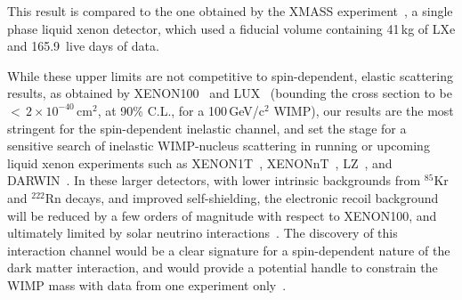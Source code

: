 This result is compared to the one obtained by the XMASS experiment~\cite{Uchida:2014cnn}, a single phase liquid xenon detector, which used a fiducial volume containing 41\,kg of LXe and 165.9~live days of data. 


While these upper limits are not competitive to spin-dependent, elastic scattering results, as obtained by XENON100~\cite{Aprile:2013doa} and LUX~\cite{Akerib:2016lao} 
(bounding the cross section to be $<\,2 \times 10^{-40}$\,cm$^{2}$, at 90\% C.L.,  for a 100\,GeV/c$^2$ WIMP), 
our results are the most stringent for the spin-dependent inelastic channel, and set the stage for a sensitive search of inelastic WIMP-nucleus scattering in running or upcoming liquid xenon experiments such as XENON1T~\cite{Aprile:2015uzo}, XENONnT~\cite{Aprile:2015uzo},  LZ~\cite{Akerib:2015cja}, and DARWIN~\cite{Aalbers:2016jon}. In these larger detectors, with lower intrinsic backgrounds from $^{85}$Kr and $^{222}$Rn decays, and improved self-shielding, the electronic recoil background will be reduced by a few orders of magnitude with respect to XENON100, and ultimately limited by solar neutrino interactions~\cite{Baudis:2013qla}. 
The discovery of this interaction channel would be a clear signature for a spin-dependent nature of the dark matter interaction, and would provide a potential handle  to constrain the WIMP mass with data from one experiment only~\cite{Baudis:2013bba,McCabe:2016aof}.

\newpage
